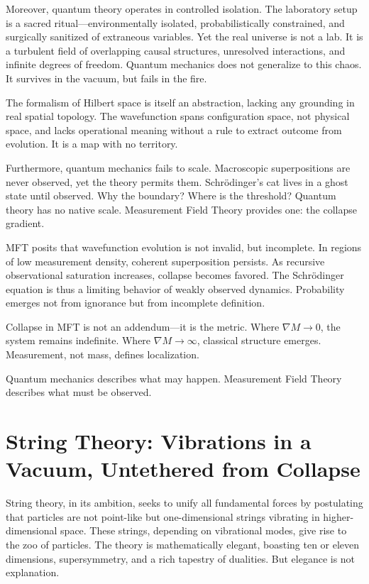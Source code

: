 Moreover, quantum theory operates in controlled isolation. The laboratory setup is a sacred ritual—environmentally isolated, probabilistically constrained, and surgically sanitized of extraneous variables. Yet the real universe is not a lab. It is a turbulent field of overlapping causal structures, unresolved interactions, and infinite degrees of freedom. Quantum mechanics does not generalize to this chaos. It survives in the vacuum, but fails in the fire.

The formalism of Hilbert space is itself an abstraction, lacking any grounding in real spatial topology. The wavefunction spans configuration space, not physical space, and lacks operational meaning without a rule to extract outcome from evolution. It is a map with no territory.

Furthermore, quantum mechanics fails to scale. Macroscopic superpositions are never observed, yet the theory permits them. Schrödinger's cat lives in a ghost state until observed. Why the boundary? Where is the threshold? Quantum theory has no native scale. Measurement Field Theory provides one: the collapse gradient.

MFT posits that wavefunction evolution is not invalid, but incomplete. In regions of low measurement density, coherent superposition persists. As recursive observational saturation increases, collapse becomes favored. The Schrödinger equation is thus a limiting behavior of weakly observed dynamics. Probability emerges not from ignorance but from incomplete definition.

Collapse in MFT is not an addendum—it is the metric. Where \(\nabla M \to 0\), the system remains indefinite. Where \(\nabla M \to \infty\), classical structure emerges. Measurement, not mass, defines localization.

Quantum mechanics describes what may happen. Measurement Field Theory describes what must be observed.

\section{String Theory: Vibrations in a Vacuum, Untethered from Collapse}
String theory, in its ambition, seeks to unify all fundamental forces by postulating that particles are not point-like but one-dimensional strings vibrating in higher-dimensional space. These strings, depending on vibrational modes, give rise to the zoo of particles. The theory is mathematically elegant, boasting ten or eleven dimensions, supersymmetry, and a rich tapestry of dualities. But elegance is not explanation.

